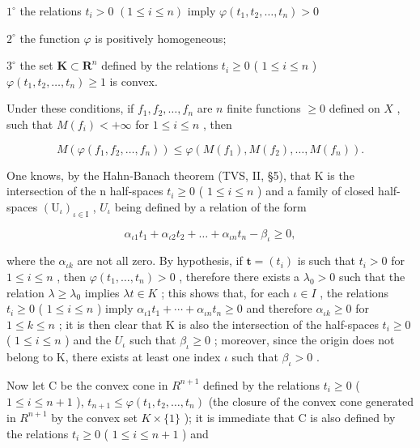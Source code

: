 \(1^{\circ}\) the relations \(t_i > 0\) \((1\leqslant i\leqslant n)\) imply \(\varphi (t_1,t_2,\dots ,t_n) > 0\)

\(2^{\circ}\) the function \(\varphi\) is positively homogeneous;

\(3^{\circ}\) the set \(\mathbf{K} \subset \mathbf{R}^{n}\) defined by the relations \(t_{i} \geqslant 0\) ( \(1 \leqslant i \leqslant n\) ) \(\varphi(t_{1}, t_{2}, \ldots, t_{n}) \geqslant 1\) is convex.

Under these conditions, if \(f_1, f_2, \ldots, f_n\) are \(n\) finite functions \(\geqslant 0\) defined on \(X\) , such that \(M(f_i) < +\infty\) for \(1 \leqslant i \leqslant n\) , then

\[
M \left(\varphi \left(f _ {1}, f _ {2}, \dots , f _ {n}\right)\right) \leqslant \varphi \left(M \left(f _ {1}\right), M \left(f _ {2}\right), \dots , M \left(f _ {n}\right)\right).\tag{1}
\]

One knows, by the Hahn-Banach theorem (TVS, II, §5), that K is the intersection of the n half-spaces \(t_{i} \geqslant 0\) ( \(1 \leqslant i \leqslant n\) ) and a family of closed half-spaces \((\mathrm{U}_{\iota})_{\iota \in \mathrm{I}}\) , \(U_{\iota}\) being defined by a relation of the form

\[
\alpha_ {\iota 1} t _ {1} + \alpha_ {\iota 2} t _ {2} + \dots + \alpha_ {\iota n} t _ {n} - \beta_ {\iota} \geqslant 0,\tag{2}
\]

where the \(\alpha_{\iota k}\) are not all zero. By hypothesis, if \(\mathbf{t}=(t_{i})\) is such that \(t_{i}>0\) for \(1\leqslant i\leqslant n\) , then \(\varphi(t_{1},\ldots,t_{n})>0\) , therefore there exists a \(\lambda_{0}>0\) such that the relation \(\lambda\geqslant\lambda_{0}\) implies \(\lambda t\in K\) ; this shows that, for each \(\iota\in I\) , the relations \(t_{i}\geqslant0\) ( \(1\leqslant i\leqslant n\) ) imply \(\alpha_{\iota1}t_{1}+\cdots+\alpha_{\iota n}t_{n}\geqslant0\) and therefore \(\alpha_{\iota k}\geqslant0\) for \(1\leqslant k\leqslant n\) ; it is then clear that K is also the intersection of the half-spaces \(t_{i}\geqslant0\) ( \(1\leqslant i\leqslant n\) ) and the \(U_{\iota}\) such that \(\beta_{\iota}\geqslant0\) ; moreover, since the origin does not belong to K, there exists at least one index \(\iota\) such that \(\beta_{\iota}>0\) .

Now let C be the convex cone in \(R^{n+1}\) defined by the relations \(t_{i} \geqslant 0\) ( \(1 \leqslant i \leqslant n + 1\) ), \(t_{n+1} \leqslant \varphi(t_{1}, t_{2}, \ldots, t_{n})\) (the closure of the convex cone generated in \(R^{n+1}\) by the convex set \(K \times \{1\}\) ); it is immediate that C is also defined by the relations \(t_{i} \geqslant 0\) ( \(1 \leqslant i \leqslant n + 1\) ) and

